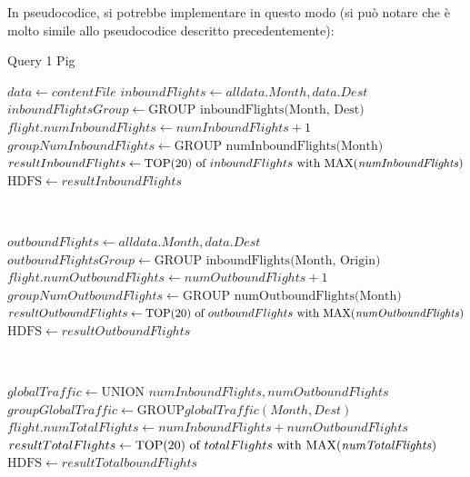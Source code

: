 \documentclass[11pt]{article} %
\begin{document}
In pseudocodice, si potrebbe implementare in questo modo (si può notare che è molto simile allo pseudocodice descritto precedentemente):


\begin{algorithm}
\caption{Query 1 Pig}\label{euclid}
\begin{algorithmic}[0]
\State $data \gets contentFile$
\State $inboundFlights \gets all data.Month, data.Dest$
\State $inboundFlightsGroup \gets \text{GROUP inboundFlights(Month, Dest)}$
\State $flight.numInboundFlights \gets numInboundFlights+1$
\EndFor
\State $groupNumInboundFlights \gets \text{GROUP numInboundFlights(Month)}$
\State $resultInboundFlights \gets \text{TOP(20) of }inboundFlights \text{ with MAX(\textit{numInboundFlights})}$
\State $\text{HDFS}\gets resultInboundFlights$

~

\State $outboundFlights \gets all data.Month, data.Dest$
\State $outboundFlightsGroup \gets \text{GROUP inboundFlights(Month, Origin)}$
\State $flight.numOutboundFlights \gets numOutboundFlights+1$
\EndFor
\State $groupNumOutboundFlights \gets \text{GROUP numOutboundFlights(Month)}$
\State $resultOutboundFlights \gets \text{TOP(20) of }outboundFlights \text{ with MAX(\textit{numOutboundFlights})}$
\State $\text{HDFS}\gets resultOutboundFlights$

~

\State $globalTraffic \gets \text{UNION } numInboundFlights, numOutboundFlights$
\State $groupGlobalTraffic \gets \text{GROUP}globalTraffic(Month, Dest)$
\State $flight.numTotalFlights \gets numInboundFlights+ numOutboundFlights$
\EndFor
\State $resultTotalFlights \gets \text{TOP(20) of }totalFlights \text{ with MAX(\textit{numTotalFlights})}$
\State $\text{HDFS}\gets resultTotalboundFlights$

\end{algorithmic}
\end{algorithm}


~
\end{document}
